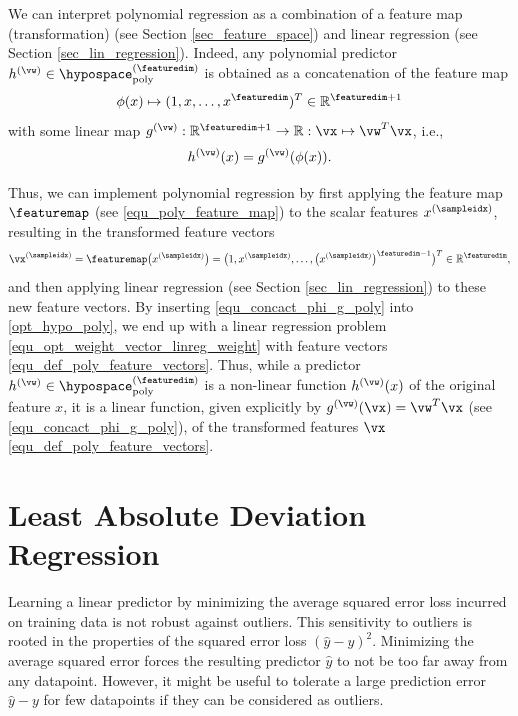 \documentclass[12pt]{report}
\begin{document}
We can interpret polynomial regression as a combination of a feature map (transformation) 
(see Section \ref{sec_feature_space}) and linear regression (see Section \ref{sec_lin_regression}). 
Indeed, any polynomial predictor $h^{(\vw)} \in \hypospace_{\rm poly}^{(\featuredim)}$ 
is obtained as a concatenation of the feature map  
\begin{equation}
\label{equ_poly_feature_map} 
\phi(x) \mapsto (1,x,\ldots,x^{\featuredim})^{T} \in \mathbb{R}^{\featuredim+1}
\end{equation}
with some linear map $g^{(\vw)}: \mathbb{R}^{\featuredim+1} \rightarrow \mathbb{R}: \vx \mapsto \vw^{T} \vx$, i.e., 
\begin{equation}
\label{equ_concact_phi_g_poly}
h^{(\vw)}(x) = g^{(\vw)}(\phi(x)). 
\end{equation}

Thus, we can implement polynomial regression by first applying the feature map $\featuremap$ 
(see \eqref{equ_poly_feature_map}) to the scalar features $x^{(\sampleidx)}$, resulting in the transformed 
feature vectors 
\begin{equation} 
\label{equ_def_poly_feature_vectors}
\vx^{(\sampleidx)} = \featuremap \big(x^{(\sampleidx)}\big) = \big(1,x^{(\sampleidx)},\ldots,\big( x^{(\sampleidx)} \big)^{\featuredim-1} \big)^{T} \in \mathbb{R}^{\featuredim}, 
\end{equation} 
and then applying linear regression  (see Section \ref{sec_lin_regression}) to these new feature vectors. 
By inserting \eqref{equ_concact_phi_g_poly} into \eqref{opt_hypo_poly}, we end up with a linear regression 
problem \eqref{equ_opt_weight_vector_linreg_weight} with feature vectors \eqref{equ_def_poly_feature_vectors}. 
Thus, while a predictor $h^{(\vw)} \in \hypospace_{\rm poly}^{(\featuredim)}$ 
is a non-linear function $h^{(\vw)}(x)$ of the original feature $x$, it is a linear 
function, given explicitly by $g^{(\vw)}(\vx) = \vw^{T}\vx$ (see \eqref{equ_concact_phi_g_poly}), 
of the transformed features $\vx$ \eqref{equ_def_poly_feature_vectors}. 

\section{Least Absolute Deviation Regression}
\label{sec_lad}

Learning a linear predictor by minimizing the average squared error loss incurred 
on training data is not robust against outliers. This sensitivity to outliers is rooted 
in the properties of the squared error loss $(\hat{y} - y)^{2}$. Minimizing the 
average squared error forces the resulting predictor $\hat{y}$ to not be too far 
away from any datapoint. However, it might be useful to tolerate a large prediction 
error $\hat{y}-y$ for few datapoints if they can be considered as outliers. 
\end{document}
